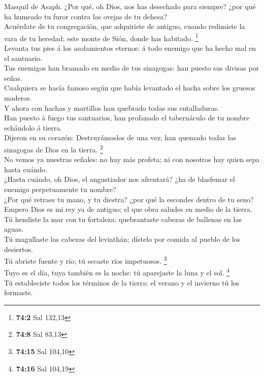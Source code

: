  Masquil de Asaph. ¿Por qué, oh Dios, nos has desechado para
siempre? ¿por qué ha humeado tu furor contra las ovejas de tu dehesa?\\
 Acuérdate de tu congregación, que adquiriste de antiguo,
cuando redimiste la vara de tu heredad; este monte de Sión, donde has
habitado. \footnote{\textbf{74:2} Sal 132,13}\\
 Levanta tus pies á los asolamientos eternos: á todo enemigo
que ha hecho mal en el santuario.\\
 Tus enemigos han bramado en medio de tus sinagogas: han
puesto sus divisas por señas.\\
 Cualquiera se hacía famoso según que había levantado el
hacha sobre los gruesos maderos.\\
 Y ahora con hachas y martillos han quebrado todas sus
entalladuras.\\
 Han puesto á fuego tus santuarios, han profanado el
tabernáculo de tu nombre echándolo á tierra.\\
 Dijeron en su corazón: Destruyámoslos de una vez; han
quemado todas las sinagogas de Dios en la tierra. \footnote{\textbf{74:8}
  Sal 83,13}\\
 No vemos ya nuestras señales: no hay más profeta; ni con
nosotros hay quien sepa hasta cuándo.\\
 ¿Hasta cuándo, oh Dios, el angustiador nos afrentará? ¿ha
de blasfemar el enemigo perpetuamente tu nombre?\\
 ¿Por qué retraes tu mano, y tu diestra? ¿por qué la
escondes dentro de tu seno?\\
 Empero Dios es mi rey ya de antiguo; el que obra saludes
en medio de la tierra.\\
 Tú hendiste la mar con tu fortaleza: quebrantaste cabezas
de ballenas en las aguas.\\
 Tú magullaste las cabezas del leviathán; dístelo por
comida al pueblo de los desiertos.\\
 Tú abriste fuente y río; tú secaste ríos impetuosos.
\footnote{\textbf{74:15} Sal 104,10}\\
 Tuyo es el día, tuya también es la noche: tú aparejaste la
luna y el sol. \footnote{\textbf{74:16} Sal 104,19}\\
 Tú estableciste todos los términos de la tierra: el verano
y el invierno tú los formaste.\\
